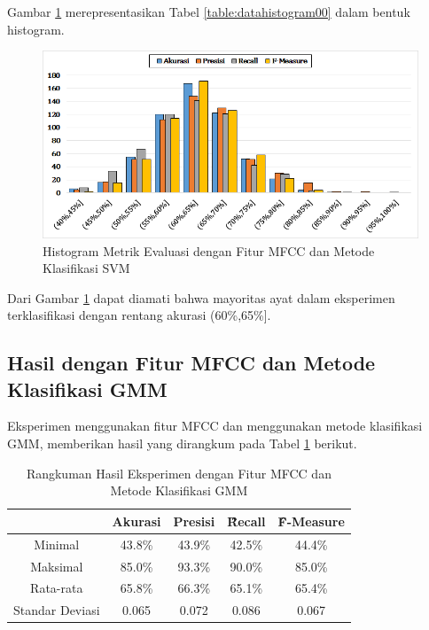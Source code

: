   Gambar \ref{fig:histogram00} merepresentasikan Tabel \ref{table:datahistogram00} dalam bentuk histogram.
  \begin{figure}
    \centering
    \includegraphics[width=\linewidth]{pics/histogram00}
    \caption{Histogram Metrik Evaluasi dengan Fitur MFCC dan Metode Klasifikasi SVM}
    \label{fig:histogram00}
  \end{figure}

  Dari Gambar \ref{fig:histogram00} dapat diamati bahwa mayoritas ayat dalam eksperimen terklasifikasi dengan rentang akurasi (60\%,65\%].




  \subsection{Hasil dengan Fitur MFCC dan Metode Klasifikasi GMM}
  Eksperimen menggunakan fitur MFCC dan menggunakan metode klasifikasi GMM, memberikan hasil yang dirangkum pada Tabel \ref{table:mfccgmm} berikut.

  \begin{table}
    \centering
    \caption{Rangkuman Hasil Eksperimen dengan Fitur MFCC dan Metode Klasifikasi GMM}
    \begin{tabular}{|c|c|c|c|c|}
      \hline
       & Akurasi & Presisi & \f{\f{Recall}} & \f{\f{F-Measure}} \\ \hline
      Minimal         & 43.8\% & 43.9\% & 42.5\% & 44.4\% \\ \hline
      Maksimal        & 85.0\% & 93.3\% & 90.0\% & 85.0\% \\ \hline
      Rata-rata       & 65.8\% & 66.3\% & 65.1\% & 65.4\% \\ \hline
      Standar Deviasi & 0.065  & 0.072  & 0.086  & 0.067  \\ \hline
    \end{tabular}
    \label{table:mfccgmm}
  \end{table}

